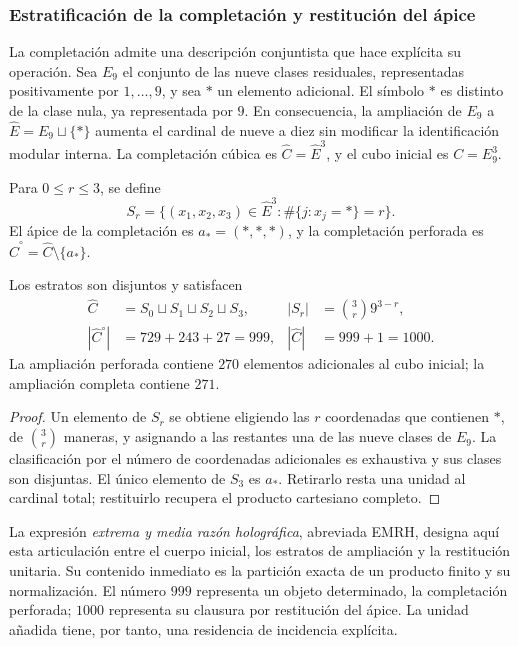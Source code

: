 \subsubsection{Estratificación de la completación y restitución del ápice}
\label{sec:revision-emrh}

La completación admite una descripción conjuntista que hace explícita su
operación. Sea \(E_9\) el conjunto de las nueve clases residuales, representadas
positivamente por \(1,\ldots,9\), y sea \(\ast\) un elemento adicional.
El símbolo \(\ast\) es distinto de la clase nula, ya representada por \(9\).
En consecuencia, la ampliación de \(E_9\) a
\(\widehat E=E_9\sqcup\{\ast\}\) aumenta el cardinal de nueve a diez
sin modificar la identificación modular interna. La completación cúbica es
\(\widehat C=\widehat E^3\), y el cubo inicial es \(C=E_9^3\).

\begin{definition}
Para \(0\leq r\leq3\), se define
\[
 S_r=\{(x_1,x_2,x_3)\in\widehat E^3:
             \#\{j:x_j=\ast\}=r\}.
\]
El ápice de la completación es \(a_\ast=(\ast,\ast,\ast)\), y la
completación perforada es \(\widehat C^{\circ}=\widehat C\setminus\{a_\ast\}\).
\end{definition}

\begin{proposition}
Los estratos son disjuntos y satisfacen
\begin{align}
 \widehat C&=S_0\sqcup S_1\sqcup S_2\sqcup S_3,
 &|S_r|&=\binom3r9^{3-r},\label{eq:revision-estratos}\\
 |\widehat C^{\circ}|&=729+243+27=999,
 &|\widehat C|&=999+1=1000.\label{eq:revision-999}
\end{align}
La ampliación perforada contiene \(270\) elementos adicionales al cubo
inicial; la ampliación completa contiene \(271\).
\end{proposition}
\begin{proof}
Un elemento de \(S_r\) se obtiene eligiendo las \(r\) coordenadas que
contienen \(\ast\), de \(\binom3r\) maneras, y asignando a las restantes
una de las nueve clases de \(E_9\). La clasificación por el número de
coordenadas adicionales es exhaustiva y sus clases son disjuntas. El único
elemento de \(S_3\) es \(a_\ast\). Retirarlo resta una unidad al cardinal
total; restituirlo recupera el producto cartesiano completo.
\end{proof}

La expresión \emph{extrema y media razón holográfica}, abreviada EMRH,
designa aquí esta articulación entre el cuerpo inicial, los
estratos de ampliación y la restitución unitaria. Su contenido inmediato
es la partición exacta de un producto finito y su normalización. El número
\(999\) representa un objeto determinado, la completación perforada;
\(1000\) representa su clausura por restitución del ápice. La unidad
añadida tiene, por tanto, una residencia de incidencia explícita.

